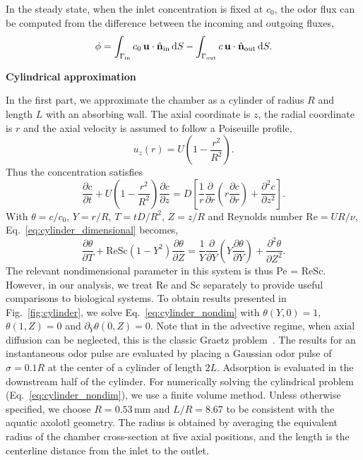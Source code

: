 \documentclass[%
 twocolumn,
 amsmath,amssymb,
 aps,prfluids,
 superscriptaddress,
]{revtex4-2}
\newcommand{\Sc}{\mathrm{Sc}}
\newcommand{\Rey}{\mathrm{Re}}
\newcommand{\diff}{\mathrm{d}}
\begin{document}
In the steady state, when the inlet concentration is fixed at $c_0$, the odor flux can be computed from the difference between the incoming and outgoing fluxes,
\begin{align}
\phi= \int_{\Gamma_{\rm in}}c_0\,\mathbf{u}\cdot\hat{\mathbf{n}}_{\rm in}\,\diff S - \int_{\Gamma_{\rm out}}c\,\mathbf{u}\cdot\hat{\mathbf{n}}_{\rm out}\,\diff S.
\label{eq:wallflux_steady}
\end{align}

\vspace{0.2in}
\noindent \textbf{Cylindrical approximation}

In the first part, we approximate the chamber as a cylinder of radius $R$ and length $L$ with an absorbing wall. The axial coordinate is $z$, the radial coordinate is $r$ and the axial velocity is assumed to follow a Poiseuille profile,
\begin{equation}
u_z(r)=U\left(1-\frac{r^2}{R^2}\right).
\label{eq:poiseuille}
\end{equation}
Thus the concentration satisfies~\cite{barrera2016graetz,leal2007advanced}
\begin{equation}
\frac{\partial c}{\partial t}+U\left(1-\frac{r^2}{R^2}\right)\frac{\partial c}{\partial z}=D\left[\frac{1}{r}\frac{\partial}{\partial r}\left(r\frac{\partial c}{\partial r}\right)+\frac{\partial^2 c}{\partial z^2}\right].
\label{eq:cylinder_dimensional}
\end{equation}
With $\theta=c/c_0$, $Y=r/R$, $T= tD/R^2$, $Z=z/R$ and Reynolds number $\Rey=UR/\nu$, Eq.~\eqref{eq:cylinder_dimensional} becomes,
\begin{equation}
    \frac{\partial \theta}{\partial T}
+
\Rey \Sc(1-Y^2)\frac{\partial \theta} {\partial Z}
=
\frac{1}{Y}\frac{\partial}{\partial Y}\left(Y\frac{\partial \theta}{\partial Y}\right)
+
\frac{\partial^2 \theta}{\partial Z^2}.
\label{eq:cylinder_nondim}
\end{equation}
The relevant nondimensional parameter in this system is thus Pe = $\Rey\Sc$. However, in our analysis, we treat $\Rey$ and $\Sc$ separately to provide useful comparisons to biological systems. To obtain results presented in Fig.~\ref{fig:cylinder}, we solve Eq.~\eqref{eq:cylinder_nondim} with $\theta(Y,0)=1$, $\theta(1,Z)=0$ and $\partial_Y\theta(0,Z)=0$. Note that in the advective regime, when axial diffusion can be neglected, this is the classic Graetz problem~\cite{brown1960heat,shah2014laminar}. The results for an instantaneous odor pulse are evaluated by placing a Gaussian odor pulse of $\sigma = 0.1R$ at the center of a cylinder of length $2L$. Adsorption is evaluated in the downstream half of the cylinder. For numerically solving the cylindrical problem (Eq.~\eqref{eq:cylinder_nondim}), we use a finite volume method. Unless otherwise specified, we choose $R = 0.53$\,mm and $L/R=8.67$ to be consistent with the aquatic axolotl geometry. The radius is obtained by averaging the equivalent radius of the chamber cross-section at five axial positions, and the length is the centerline distance from the inlet to the outlet.
\end{document}
